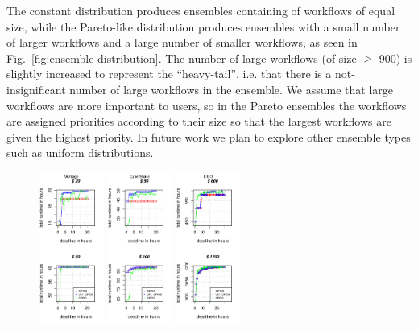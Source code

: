 \documentclass{sig-alternate}
\begin{document}
The constant distribution produces ensembles containing of workflows of equal size, 
while the Pareto-like distribution produces ensembles with a small number of larger 
workflows and a large number of smaller workflows, as seen in 
Fig.~\ref{fig:ensemble-distribution}. The number of large workflows (of size $\geq$ 900) 
is slightly increased to represent the ``heavy-tail'', i.e. that there is a 
not-insignificant number of large workflows in the ensemble. We assume that large
workflows are more important to users, so in the Pareto ensembles the workflows are 
assigned priorities according to their size so that the largest workflows are given 
the highest priority. In future work we plan to explore other ensemble types such as
uniform distributions.

\begin{figure}[t]  
\centering
\includegraphics[width=0.19\textwidth]{figures/pareto-size-MONTAGE-n-1000-8-dagh1-20m0.pdf}
\includegraphics[width=0.19\textwidth]{figures/pareto-size-CYBERSHAKE-n-1000-8-dagh1-20m0.pdf}
\includegraphics[width=0.19\textwidth]{figures/pareto-size-LIGO-n-1000-8-dagh1-40m0.pdf}

\end{figure}
\end{document}
